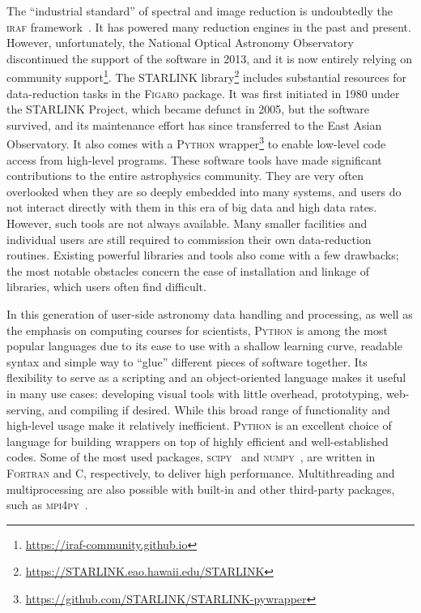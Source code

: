 \documentclass[linenumbers, twocolumn]{aastex631}
\begin{document}
The ``industrial standard'' of spectral and image reduction is undoubtedly
the \textsc{iraf} framework~\citep{1986SPIE..627..733T, 1993ASPC...52..173T}.
It has powered many reduction engines in the past and present. However,
unfortunately, the National Optical Astronomy Observatory 
discontinued the support of the software in 2013, and it is now
entirely relying on community support\footnote{\url{https://iraf-community.github.io}}.
The \textsc{STARLINK}
library\footnote{\url{https://STARLINK.eao.hawaii.edu/STARLINK}} \citep{2014ASPC..485..391C, 2022ASPC..532..559B}
includes substantial resources for data-reduction tasks in the \textsc{Figaro} package. It was first initiated
in 1980 under the STARLINK Project, which became defunct in 2005, but the
software survived, and its maintenance effort has since transferred to the
East Asian Observatory. It also comes with a \textsc{Python}
wrapper\footnote{\url{https://github.com/STARLINK/STARLINK-pywrapper}}
to enable low-level code access from high-level programs. These software tools
have made significant contributions to the entire astrophysics community. They
are very often overlooked when they are so deeply embedded into many systems,
and users do not interact directly with them in this era of big data
and high data rates. However, such tools are not always available.
Many smaller facilities and individual users are still required to commission
their own data-reduction routines. Existing powerful libraries and
tools also come with a few drawbacks; the most notable obstacles concern the
ease of installation and linkage of libraries, which users often find difficult.

In this generation of user-side astronomy data handling and processing, as
well as the emphasis on computing courses for scientists, \textsc{Python} is
among the most popular languages due to its ease to use with a shallow learning
curve, readable syntax and simple way to ``glue'' different pieces of software
together. Its flexibility to serve as a scripting and an object-oriented
language makes it useful in many use cases: developing visual tools
with little overhead, prototyping, web-serving, and compiling if
desired. While this broad range of functionality and high-level usage make it
relatively inefficient. \textsc{Python} is an excellent choice of
language for building wrappers on top of highly efficient and well-established codes.
Some of the most used packages, \textsc{scipy}~\citep{2020SciPy-NMeth}
and \textsc{numpy}~\citep{2020NumPy-Array}, are written in \textsc{Fortran}
and \textsc{C}, respectively, to deliver high performance. Multithreading
and multiprocessing are also possible with built-in and other third-party
packages, such as \textsc{mpi4py}~\citep{DALCIN20111124}. 
\end{document}
